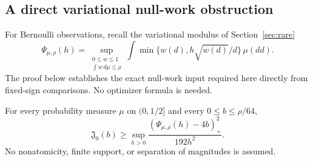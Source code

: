 \subsection{A direct variational null-work obstruction}

For Bernoulli observations, recall the variational modulus of
Section~\ref{sec:rare}
\begin{equation}
 \Psi_{\mu,\rho}(h)=
 \sup_{\substack{0\le w\le1\\\int w\,d\mu\le\rho}}
 \int\min\{w(d),h\sqrt{w(d)}/d\}\,\mu(dd).
 \label{eq:inherited-psi}
\end{equation}
The proof below establishes the exact null-work input required here
directly from fixed-sign comparisons. No optimizer formula is needed.

\begin{proposition}
\label{prop:psi-null}
For every probability measure \(\mu\) on \((0,1/2]\) and every
\(0\le b\le\rho/64\),
\begin{equation}
 \mathfrak J_0(b)\ge
 \sup_{h>0}\frac{(\Psi_{\mu,\rho}(h)-4b)_+^2}{192h^2}.
 \label{eq:psi-null-product}
\end{equation}
No nonatomicity, finite support, or separation of magnitudes is assumed.
\end{proposition}

